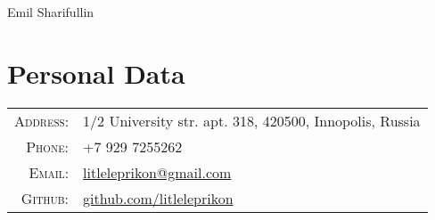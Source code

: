\documentclass[a4paper,10pt]{article}
\begin{document}
\par{\centering
		{\Huge Emil Sharifullin
	}\bigskip\par}


\section{Personal Data}

\begin{tabular}{r p{11cm}}
    \textsc{Address:}   & 1/2 University str. apt. 318, 420500, Innopolis, Russia \\
    \textsc{Phone:}     & +7 929 7255262\\
    \textsc{Email:}     &  \href{mailto:litleleprikon@gmail.com}{litleleprikon@gmail.com} \\
    \textsc{Github:}     &  \href{https://github.com/litleleprikon}{github.com/litleleprikon}
\end{tabular}

\end{document}
